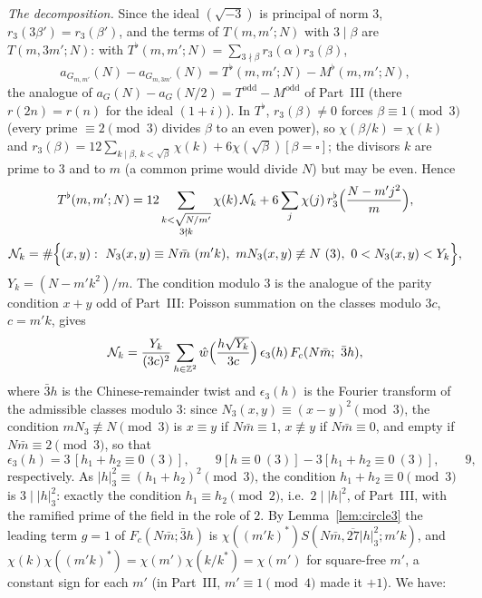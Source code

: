 \documentclass[11pt]{amsart}
\theoremstyle{remark}
\newcommand{\Z}{\mathbb{Z}}
\begin{document}
\emph{The decomposition.} Since the ideal $(\sqrt{-3})$ is principal of norm $3$, $r_3(3\beta')=r_3(\beta')$, and the terms of $T(m,m';N)$ with $3\mid\beta$ are $T(m,3m';N)$: with $T^\flat(m,m';N)=\sum_{3\nmid\beta}r_3(\alpha)r_3(\beta)$,
\[
a_{G_{m,m'}}(N)-a_{G_{m,3m'}}(N)=T^\flat(m,m';N)-M^\flat(m,m';N),
\]
the analogue of $a_G(N)-a_G(N/2)=T^{\mathrm{odd}}-M^{\mathrm{odd}}$ of Part~III (there $r(2n)=r(n)$ for the ideal $(1+i)$). In $T^\flat$, $r_3(\beta)\ne0$ forces $\beta\equiv1\pmod3$ (every prime $\equiv2\pmod3$ divides $\beta$ to an even power), so $\chi(\beta/k)=\chi(k)$ and $r_3(\beta)=12\sum_{k\mid\beta,\,k<\sqrt\beta}\chi(k)+6\chi(\sqrt\beta)[\beta=\square]$; the divisors $k$ are prime to $3$ and to $m$ (a common prime would divide $N$) but may be even. Hence
\begin{gather*}
T^\flat(m,m';N)=12\sum_{\substack{k<\sqrt{N/m'}\\ 3\nmid k}}\chi(k)\,\mathcal N_k+6\sum_j\chi(j)\,r_3^\flat\Bigl(\frac{N-m'j^2}m\Bigr),\\
\mathcal N_k=\#\Bigl\{(x,y):\ N_3(x,y)\equiv N\bar m\ (m'k),\ mN_3(x,y)\not\equiv N\ (3),\ 0<N_3(x,y)<Y_k\Bigr\},
\end{gather*}
$Y_k=(N-m'k^2)/m$. The condition modulo $3$ is the analogue of the parity condition $x+y$ odd of Part~III: Poisson summation on the classes modulo $3c$, $c=m'k$, gives
\[
\mathcal N_k=\frac{Y_k}{(3c)^2}\sum_{h\in\Z^2}\hat w\Bigl(\frac{h\sqrt{Y_k}}{3c}\Bigr)\,\epsilon_3(h)\,F_c(N\bar m;\ \bar3h),
\]
where $\bar3h$ is the Chinese-remainder twist and $\epsilon_3(h)$ is the Fourier transform of the admissible classes modulo $3$: since $N_3(x,y)\equiv(x-y)^2\pmod3$, the condition $mN_3\not\equiv N\pmod 3$ is $x\equiv y$ if $N\bar m\equiv1$, $x\not\equiv y$ if $N\bar m\equiv0$, and empty if $N\bar m\equiv2\pmod3$, so that
\[
\epsilon_3(h)=3\,[h_1+h_2\equiv0\ (3)],\qquad 9[h\equiv0\ (3)]-3[h_1+h_2\equiv0\ (3)],\qquad 9,
\]
respectively. As $|h|_3^2\equiv(h_1+h_2)^2\pmod3$, the condition $h_1+h_2\equiv0\pmod3$ is $3\mid|h|_3^2$: exactly the condition $h_1\equiv h_2\pmod2$, i.e.\ $2\mid|h|^2$, of Part~III, with the ramified prime of the field in the role of $2$. By Lemma~\ref{lem:circle3} the leading term $g=1$ of $F_c(N\bar m;\bar3h)$ is $\chi((m'k)^{*})S(N\bar m,\overline{27}|h|_3^2;m'k)$, and $\chi(k)\chi((m'k)^{*})=\chi(m')\chi(k/k^{*})=\chi(m')$ for square-free $m'$, a constant sign for each $m'$ (in Part~III, $m'\equiv1\pmod4$ made it $+1$). We have:
\end{document}
